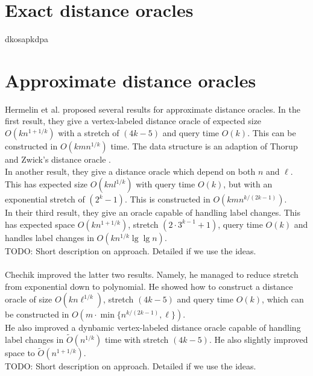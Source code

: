 \section{Exact distance oracles}
dkosapkdpa

\section{Approximate distance oracles}
Hermelin et al. \cite{hermelin2011distance} proposed several results for approximate
distance oracles. In the first result, they give a vertex-labeled distance oracle of
expected size $O(kn^{1+1/k})$ with a stretch of $(4k-5)$ and query time $O(k)$. This can
be constructed in $O(kmn^{1/k})$ time. The data structure is an adaption of Thorup and
Zwick's distance oracle \cite{thorup2005approximate}. \\
In another result, they give a distance oracle which depend on both $n$ and $\ell$. This has
expected size $O(knl^{1/k})$ with query time $O(k)$, but with an exponential stretch of
$(2^k-1)$. This is constructed in $O(kmn^{k/(2k-1)})$. \\
In their third result, they give an oracle capable of handling label changes. This has
expected space $O(kn^{1+1/k})$, stretch $(2\cdot3^{k-1}+1)$, query time $O(k)$ and
handles label changes in $O(kn^{1/k}\lg \lg n)$. \\
TODO: Short description on approach. Detailed if we use the ideas. \\
\\
Chechik \cite{chechik2012improved} improved the latter two results. Namely, he managed to
reduce stretch from exponential down to polynomial. He showed how to construct a distance oracle
of size $O(kn\ell^{1/k})$, stretch $(4k-5)$  and query time $O(k)$, which can be
constructed in $O(m\cdot \min\{n^{k/(2k-1)}, \ell\})$. \\
He also improved a dynbamic vertex-labeled distance oracle capable of handling label changes in
$\tilde{O}(n^{1/k})$ time with stretch $(4k-5)$. He also slightly improved space to
$\tilde{O}(n^{1+1/k})$. \\
TODO: Short description on approach. Detailed if we use the ideas.

